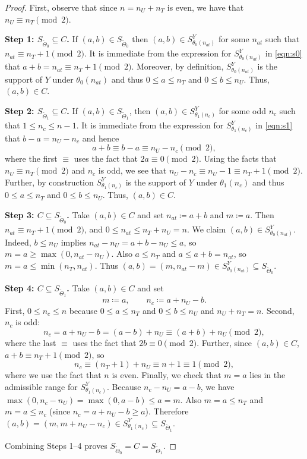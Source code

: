 \documentclass[12pt,reqno]{amsart}
\theoremstyle{theorem}
\theoremstyle{definition}
\newcommand{\0}{\mathbf{0}}
\newcommand{\1}{\mathbf{1}}
\begin{document}
\begin{proof}
First, observe that since $n = n_U + n_T$ is even, we have that $n_U\equiv n_T\pmod 2$. 

\textbf{Step 1: $S_{\tilde{\Theta}_0} \subseteq C$.}
If $(a,b) \in S_{\tilde{\Theta}_0}$ then $(a,b)\in S^Y_{\theta_0(n_{at})}$ for some $n_{at}$ such that $n_{at}\equiv n_T+1\pmod 2$. It is immediate from the expression for $S^Y_{\theta_0(n_{at})}$ in \eqref{eqn:s0} that $a+b=n_{at} \equiv n_T+1 \pmod 2$. Moreover, by definition, $S^Y_{\theta_0(n_{at})}$ is the support of $Y$ under $\theta_0(n_{at})$ and thus $0 \leq a \leq n_T$ and $0 \leq b \leq n_U$. Thus, $(a,b)\in C$.

\medskip
\textbf{Step 2: $S_{\tilde{\Theta}_1} \subseteq C$.}
If $(a,b) \in S_{\tilde{\Theta}_1}$, then $(a,b)\in S^Y_{\theta_1(n_c)}$ for some odd $n_c$ such that $1 \leq n_c \leq n - 1$. It is immediate from the expression for $S^Y_{\theta_1(n_c)}$ in \eqref{eqn:s1} that $b-a=n_U-n_c$ and hence
\[
a+b\equiv b-a\equiv n_U-n_c \pmod 2,
\]
where the first $\equiv$ uses the fact that $2a \equiv 0 \pmod2$. Using the facts that $n_U\equiv n_T\pmod 2$ and $n_c$ is odd, we see that $n_U-n_c\equiv n_U-1\equiv n_T+1\pmod 2$. Further, by construction $S^Y_{\theta_1(n_c)}$ is the support of $Y$ under $\theta_1(n_c)$ and thus $0 \leq a \leq n_T$ and $0 \leq b \leq n_U$. Thus, $(a,b)\in C$.

\medskip
\textbf{Step 3: $C\subseteq S_{\tilde{\Theta}_0}$.}
Take $(a,b)\in C$ and set $n_{at}\coloneqq a+b$ and $m\coloneqq a$.
Then $n_{at}\equiv n_T+1\pmod 2$, and $0\le n_{at}\le n_T+n_U=n$.
We claim $(a,b)\in S^Y_{\theta_0(n_{at})}$.
Indeed, $b\le n_U$ implies $n_{at}-n_U=a+b-n_U\le a$, so $m=a\ge \max(0,n_{at}-n_U)$.
Also $a\le n_T$ and $a\le a+b = n_{at}$, so $m=a\le \min(n_T,n_{at})$.
Thus $(a,b)=(m,n_{at}-m)\in S^Y_{\theta_0(n_{at})}\subseteq S_{\tilde{\Theta}_0}$.

\medskip
\textbf{Step 4: $C\subseteq S_{\tilde{\Theta}_1}$.}
Take $(a,b)\in C$ and set
\[
 m\coloneqq a,\qquad n_c\coloneqq a+n_U-b.
\]
First, $0\le n_c\le n$ because $0\le a\le n_T$ and $0\le b\le n_U$ and $n_U + n_T =n$.
Second, $n_c$ is odd:
\[
 n_c =  a+n_U-b = (a-b)+n_U\equiv (a+b)+n_U\pmod 2,
\]
where the last $\equiv$ uses the fact that $2b \equiv 0 \pmod 2$. Further, since $(a,b)\in C$, $a+b\equiv n_T+1\pmod 2$, so
\[
 n_c\equiv (n_T+1)+n_U \equiv n+1 \equiv 1\pmod 2,
\]
where we use the fact that $n$ is even. Finally, we check that $m=a$ lies in the admissible range for $S^Y_{\theta_1(n_c)}$.
Because $n_c-n_U=a-b$, we have $\max(0,n_c-n_U)=\max(0,a-b)\le a=m$.
Also $m=a\le n_T$ and $m=a\le n_c$ (since $n_c=a+n_U-b\ge a$).
Therefore $(a,b)=(m, m+n_U-n_c)\in S^Y_{\theta_1(n_c)}\subseteq S_{\tilde{\Theta}_1}$.

Combining Steps 1--4 proves $S_{\tilde{\Theta}_0}=C=S_{\tilde{\Theta}_1}$.
\end{proof}
\end{document}
